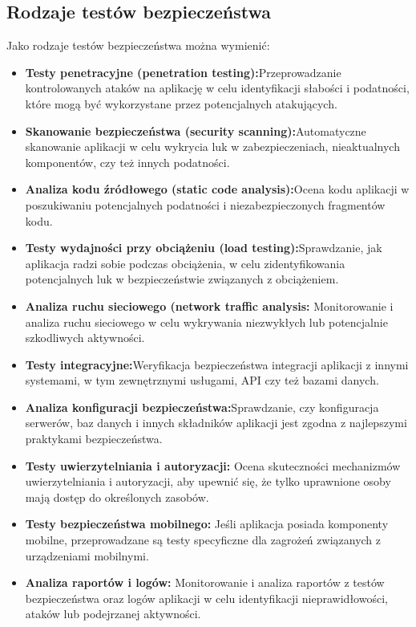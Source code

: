 \documentclass[12pt,twoside]{article}
\begin{document}
\subsection{Rodzaje testów bezpieczeństwa}

Jako rodzaje testów bezpieczeństwa można wymienić: 

\begin{itemize}
    \item \textbf{Testy penetracyjne (penetration testing):}Przeprowadzanie kontrolowanych ataków na aplikację w celu identyfikacji słabości i podatności, które mogą być wykorzystane przez potencjalnych atakujących.
    \item \textbf{Skanowanie bezpieczeństwa (security scanning):}Automatyczne skanowanie aplikacji w celu wykrycia luk w zabezpieczeniach, nieaktualnych komponentów, czy też innych podatności.
    \item \textbf{Analiza kodu źródłowego (static code analysis):}Ocena kodu aplikacji w poszukiwaniu potencjalnych podatności i niezabezpieczonych fragmentów kodu.
    \item \textbf{Testy wydajności przy obciążeniu (load testing):}Sprawdzanie, jak aplikacja radzi sobie podczas obciążenia, w celu zidentyfikowania potencjalnych luk w bezpieczeństwie związanych z obciążeniem.
    \item \textbf{Analiza ruchu sieciowego (network traffic analysis:} Monitorowanie i analiza ruchu sieciowego w celu wykrywania niezwykłych lub potencjalnie szkodliwych aktywności.
    \item \textbf{Testy integracyjne:}Weryfikacja bezpieczeństwa integracji aplikacji z innymi systemami, w tym zewnętrznymi usługami, API czy też bazami danych.
    \item \textbf{Analiza konfiguracji bezpieczeństwa:}Sprawdzanie, czy konfiguracja serwerów, baz danych i innych składników aplikacji jest zgodna z najlepszymi praktykami bezpieczeństwa.
    \item \textbf{Testy uwierzytelniania i autoryzacji:} Ocena skuteczności mechanizmów uwierzytelniania i autoryzacji, aby upewnić się, że tylko uprawnione osoby mają dostęp do określonych zasobów.
    \item \textbf{Testy bezpieczeństwa mobilnego:} Jeśli aplikacja posiada komponenty mobilne, przeprowadzane są testy specyficzne dla zagrożeń związanych z urządzeniami mobilnymi.
    \item \textbf{Analiza raportów i logów:} Monitorowanie i analiza raportów z testów bezpieczeństwa oraz logów aplikacji w celu identyfikacji nieprawidłowości, ataków lub podejrzanej aktywności.
\end{itemize}
\end{document}
